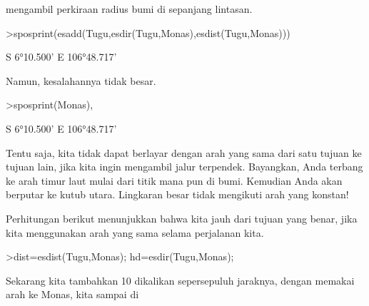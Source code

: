 \documentclass[a4paper,10pt]{article}
\begin{document}
\begin{eulernotebook}
\begin{eulercomment}
\begin{eulercomment}
\begin{eulercomment}
\begin{eulercomment}
\begin{eulercomment}
\begin{eulercomment}
\begin{eulercomment}
\begin{eulercomment}
\begin{eulercomment}
\begin{eulercomment}
\begin{eulercomment}
\begin{eulercomment}
\begin{eulercomment}
\begin{eulercomment}
\begin{eulercomment}
\begin{eulercomment}
\begin{eulercomment}
\begin{eulercomment}
\begin{eulercomment}
\begin{eulercomment}
\begin{eulercomment}
\begin{eulercomment}
\begin{eulercomment}
\begin{eulercomment}
\begin{eulercomment}
\begin{eulercomment}
\begin{eulercomment}
\begin{eulercomment}
\begin{eulercomment}
\begin{eulercomment}
\begin{eulercomment}
\begin{eulercomment}
\begin{eulercomment}
\begin{eulercomment}
\begin{eulercomment}
\begin{eulercomment}
\begin{eulercomment}
\begin{eulercomment}
\begin{eulercomment}
\begin{eulercomment}
\begin{eulercomment}
\begin{eulercomment}
\begin{eulercomment}
\begin{eulercomment}
\begin{eulercomment}
\begin{eulercomment}
\begin{eulercomment}
\begin{eulercomment}
\begin{eulercomment}
\begin{eulercomment}
\begin{eulercomment}
\begin{eulercomment}
\begin{eulercomment}
\begin{eulercomment}
\begin{eulercomment}
\begin{eulercomment}
\begin{eulercomment}
\begin{eulercomment}
\begin{eulercomment}
\begin{eulercomment}
\begin{eulercomment}
\begin{eulercomment}
\begin{eulercomment}
\begin{eulercomment}
\begin{eulercomment}
mengambil
perkiraan radius bumi di sepanjang lintasan.
\end{eulercomment}
\begin{eulerprompt}
>sposprint(esadd(Tugu,esdir(Tugu,Monas),esdist(Tugu,Monas)))
\end{eulerprompt}
\begin{euleroutput}
  S 6°10.500' E 106°48.717'
\end{euleroutput}
\begin{eulercomment}
Namun, kesalahannya tidak besar.
\end{eulercomment}
\begin{eulerprompt}
>sposprint(Monas),
\end{eulerprompt}
\begin{euleroutput}
  S 6°10.500' E 106°48.717'
\end{euleroutput}
\begin{eulercomment}
Tentu saja, kita tidak dapat berlayar dengan arah yang sama dari satu
tujuan ke tujuan lain, jika kita ingin mengambil jalur terpendek.
Bayangkan, Anda terbang ke arah timur laut mulai dari titik mana pun
di bumi. Kemudian Anda akan berputar ke kutub utara. Lingkaran besar
tidak mengikuti arah yang konstan!

Perhitungan berikut menunjukkan bahwa kita jauh dari tujuan yang
benar, jika kita menggunakan arah yang sama selama perjalanan kita.
\end{eulercomment}
\begin{eulerprompt}
>dist=esdist(Tugu,Monas); hd=esdir(Tugu,Monas);
\end{eulerprompt}
\begin{eulercomment}
Sekarang kita tambahkan 10 dikalikan sepersepuluh jaraknya, dengan
memakai arah ke Monas, kita sampai di 
\end{eulercomment}
\end{eulercomment}
\end{eulercomment}
\end{eulercomment}
\end{eulercomment}
\end{eulercomment}
\end{eulercomment}
\end{eulercomment}
\end{eulercomment}
\end{eulercomment}
\end{eulercomment}
\end{eulercomment}
\end{eulercomment}
\end{eulercomment}
\end{eulercomment}
\end{eulercomment}
\end{eulercomment}
\end{eulercomment}
\end{eulercomment}
\end{eulercomment}
\end{eulercomment}
\end{eulercomment}
\end{eulercomment}
\end{eulercomment}
\end{eulercomment}
\end{eulercomment}
\end{eulercomment}
\end{eulercomment}
\end{eulercomment}
\end{eulercomment}
\end{eulercomment}
\end{eulercomment}
\end{eulercomment}
\end{eulercomment}
\end{eulercomment}
\end{eulercomment}
\end{eulercomment}
\end{eulercomment}
\end{eulercomment}
\end{eulercomment}
\end{eulercomment}
\end{eulercomment}
\end{eulercomment}
\end{eulercomment}
\end{eulercomment}
\end{eulercomment}
\end{eulercomment}
\end{eulercomment}
\end{eulercomment}
\end{eulercomment}
\end{eulercomment}
\end{eulercomment}
\end{eulercomment}
\end{eulercomment}
\end{eulercomment}
\end{eulercomment}
\end{eulercomment}
\end{eulercomment}
\end{eulercomment}
\end{eulercomment}
\end{eulercomment}
\end{eulercomment}
\end{eulercomment}
\end{eulercomment}
\end{eulercomment}
\end{eulernotebook}
\end{document}
